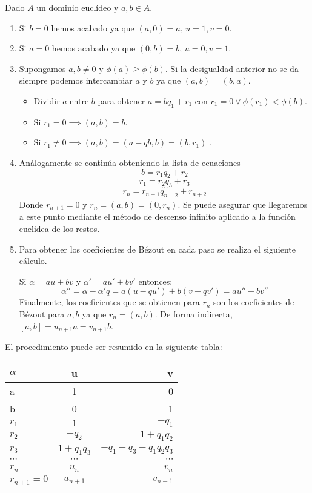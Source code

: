 \begin{theorem}
Dado $A$ un dominio euclídeo y $a,b \in A$. 

\begin{enumerate}
\item Si $b = 0$ hemos acabado ya que $(a,0) = a$, $u = 1,v= 0$. 
\item Si $a = 0$ hemos acabado ya que $(0,b) = b$, $u = 0,v= 1$. 
\item Supongamos $a,b \neq 0$ y $\phi(a) \ge \phi(b)$. Si la desigualdad anterior no se da siempre podemos intercambiar $a$ y $b$ ya que $(a,b) = (b,a)$. 
\begin{itemize}
\item Dividir $a$ entre $b$ para obtener $a = bq_1+r_1$ con $r_1 = 0 \lor \phi(r_1) < \phi(b)$. 
\item Si $r_1 = 0 \implies (a,b) = b$.
\item Si $r_1 \neq 0 \implies (a,b) = (a-qb,b) = (b,r_1)$ . 
\end{itemize}
\item Análogamente se continúa obteniendo la lista de ecuaciones $$b = r_1q_2+r_2$$ $$r_1 = r_2q_3+r_3$$ $$\ldots$$ $$r_n = r_{n+1}q_{n+2}+r_{n+2}$$ Donde $r_{n+1} = 0$ y $r_n = (a,b) = (0,r_n)$. Se puede asegurar que llegaremos a este punto mediante el método de descenso infinito aplicado a la función euclídea de los restos. 

\item Para obtener los coeficientes de Bézout en cada paso se realiza el siguiente cálculo. 

Si $\alpha = au+bv$ y $\alpha' = au'+bv'$ entonces: $$\alpha'' = \alpha - \alpha'q = a(u-qu') + b(v-qv') = au'' + bv''$$ Finalmente, los coeficientes que se obtienen para $r_n$ son los coeficientes de Bézout para $a,b$ ya que $r_n = (a,b)$. De forma indirecta, $[a,b] = u_{n+1}a = v_{n+1}b$. 
\end{enumerate}

El procedimiento puede ser resumido en la siguiente tabla:

\begin{center}
  \begin{tabular}{ | l | c | r |}
    \hline
    $\alpha$ & u & v \\ \hline
    a & 1 & 0 \\ \hline
    b & 0 & 1 \\ \hline
    $r_1$ & $1$ & $-q_1$ \\ \hline
    $r_2$ & $-q_2$ & $1+q_1q_2$ \\ \hline
    $r_3$ & $1+q_1q_3$ & $-q_1-q_3-q_1q_2q_3$ \\ \hline
    $\cdots$ & $\cdots$ & $\cdots$ \\ \hline 
    $r_n$ & $u_n$ & $v_n$ \\ \hline
    $r_{n+1} = 0$ & $u_{n+1}$ & $v_{n+1}$ \\ 
    \hline
  \end{tabular}
\end{center}


\end{theorem}
